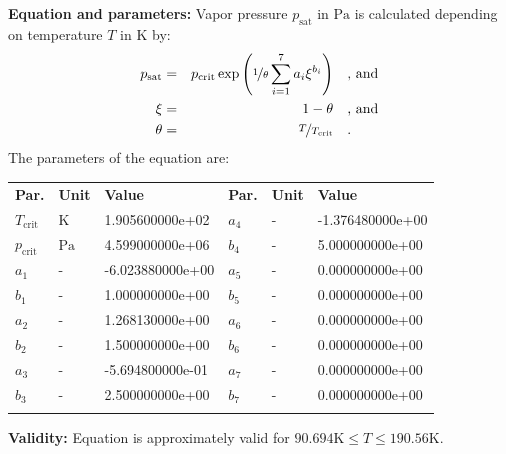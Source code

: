 \textbf{Equation and parameters:}
\newline
%
Vapor pressure $p_\mathrm{sat}$ in $\si{\pascal}$ is calculated depending on temperature $T$ in $\si{\kelvin}$ by:
%
\begin{equation*}
\begin{split}
p_\mathrm{sat} &=& p_\mathrm{crit} \exp \left( \nicefrac{1}{\theta} \sum_{i=1}^{7} a_i \xi^{b_i} \right) & \quad\text{, and} \\
\xi &=& 1 - \theta & \quad\text{, and} \\
\theta &=& \nicefrac{T}{T_\mathrm{crit}} & \quad\text{.}
\end{split}
\end{equation*}
%
The parameters of the equation are:
%
\begin{longtable}[l]{lll|lll}
\toprule
\addlinespace
\textbf{Par.} & \textbf{Unit} & \textbf{Value} &	\textbf{Par.} & \textbf{Unit} & \textbf{Value} \\
\addlinespace
\midrule
\endhead

\bottomrule
\endfoot
\bottomrule
\endlastfoot
\addlinespace

$T_\mathrm{crit}$ & $\si{\kelvin}$ & 1.905600000e+02 & $a_4$ & - & -1.376480000e+00 \\
$p_\mathrm{crit}$ & $\si{\pascal}$ & 4.599000000e+06 & $b_4$ & - & 5.000000000e+00 \\
$a_1$ & - & -6.023880000e+00 & $a_5$ & - & 0.000000000e+00 \\
$b_1$ & - & 1.000000000e+00 & $b_5$ & - & 0.000000000e+00 \\
$a_2$ & - & 1.268130000e+00 & $a_6$ & - & 0.000000000e+00 \\
$b_2$ & - & 1.500000000e+00 & $b_6$ & - & 0.000000000e+00 \\
$a_3$ & - & -5.694800000e-01 & $a_7$ & - & 0.000000000e+00 \\
$b_3$ & - & 2.500000000e+00 & $b_7$ & - & 0.000000000e+00 \\

\addlinespace\end{longtable}

\textbf{Validity:}
\newline
Equation is approximately valid for $90.694 \si{\kelvin} \leq T \leq 190.56 \si{\kelvin}$.
\newline

